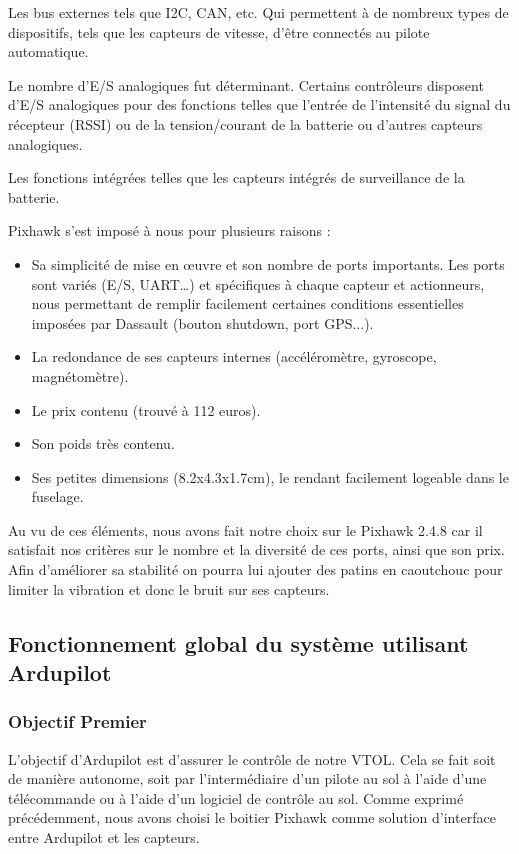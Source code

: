 \documentclass[a4paper,12pt,french]{report}
\begin{document}
Les bus externes tels que I2C, CAN, etc. Qui permettent à de nombreux types de dispositifs, tels que les capteurs de vitesse, d'être connectés au pilote automatique.\newline

Le nombre d'E/S analogiques fut déterminant. Certains contrôleurs disposent d'E/S analogiques pour des fonctions telles que l'entrée de l'intensité du signal du récepteur (RSSI) ou de la tension/courant de la batterie ou d'autres capteurs analogiques.\newline

Les fonctions intégrées telles que les capteurs intégrés de surveillance de la batterie.

Pixhawk s’est imposé à nous pour plusieurs raisons :
\begin{itemize}
    \item Sa simplicité de mise en œuvre et son nombre de ports importants. Les ports sont variés (E/S, UART…) et spécifiques à chaque capteur et actionneurs, nous permettant de remplir facilement certaines conditions essentielles imposées par Dassault (bouton shutdown, port GPS...).
    \item La redondance de ses capteurs internes (accéléromètre, gyroscope, magnétomètre).
    \item Le prix contenu (trouvé à 112 euros).
    \item Son poids très contenu.
    \item Ses petites dimensions (8.2x4.3x1.7cm), le rendant facilement logeable dans le fuselage.
\end{itemize}
Au vu de ces éléments, nous avons fait notre choix sur le Pixhawk 2.4.8 car il satisfait nos critères sur le nombre et la diversité de ces ports, ainsi que son prix. Afin d’améliorer sa stabilité on pourra lui ajouter des patins en caoutchouc pour limiter la vibration et donc le bruit sur ses capteurs.

\subsection{Fonctionnement global du système utilisant Ardupilot}

\subsubsection{Objectif Premier}
L’objectif d’Ardupilot est d’assurer le contrôle de notre VTOL. Cela se fait soit de manière autonome, soit par l’intermédiaire d’un pilote au sol à l’aide d’une télécommande ou à l’aide d’un logiciel de contrôle au sol. Comme exprimé précédemment, nous avons choisi le boitier Pixhawk comme solution d’interface entre Ardupilot et les capteurs.
\end{document}
